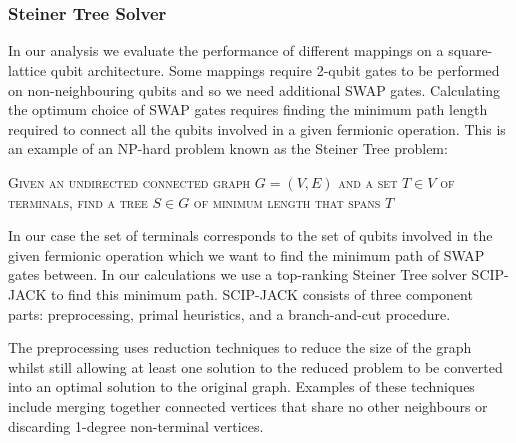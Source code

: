 

\ifpdf
    \graphicspath{{Appendix1/Figs/Raster/}{Appendix1/Figs/PDF/}{Appendix1/Figs/}{Appendix1/}}
\else
    \graphicspath{{Appendix1/Figs/Vector/}{Appendix1/Figs/}{Appendix1/}}
\fi
\chapter{} 
\section{}
\subsection{Steiner Tree Solver}
\label{section:SCIPJACK}
In our analysis we evaluate the performance of different mappings on a square-lattice qubit architecture. Some mappings require 2-qubit gates to be performed on non-neighbouring qubits and so we need additional SWAP gates. Calculating the optimum choice of SWAP gates requires finding the minimum path length required to connect all the qubits involved in a given fermionic operation. This is an example of an NP-hard problem known as the Steiner Tree problem:

\begin{algorithm}[h]
\centering
\caption*{\label{alg:steinerTree}\textsc{Steiner Tree Problem}}
\begin{algorithmic}
\State \textsc{Given an undirected connected graph $G = (V,E)$ and a set $T \in V$ of terminals, find a tree $S \in G$ of minimum length that spans $T$}
\end{algorithmic}
\end{algorithm}

In our case the set of terminals corresponds to the set of qubits involved in the given fermionic operation which we want to find the minimum path of SWAP gates between. In our calculations we use a top-ranking Steiner Tree solver SCIP-JACK \cite{rehfeldt2021implications} to find this minimum path.  SCIP-JACK consists of three component parts: preprocessing, primal heuristics, and a branch-and-cut procedure.

The preprocessing uses reduction techniques to reduce the size of the graph whilst still allowing at least one solution to the reduced problem to be converted into an optimal solution to the original graph. Examples of these techniques include merging together connected vertices that share no other neighbours or discarding 1-degree non-terminal vertices.

